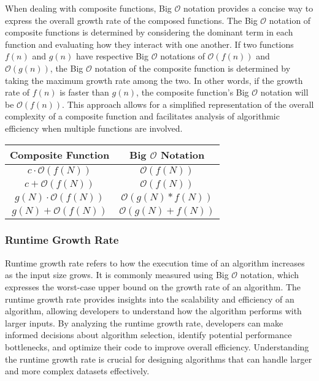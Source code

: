 When dealing with composite functions, Big $\mathcal{O}$ notation provides a concise way to express the overall growth rate of the composed functions. The Big $\mathcal{O}$ notation of composite functions is determined by considering the dominant term in each function and evaluating how they interact with one another. If two functions $f(n)$ and $g(n)$ have respective Big $\mathcal{O}$ notations of $\mathcal{O}(f(n))$ and 
$\mathcal{O}(g(n))$, the Big $\mathcal{O}$ notation of the composite function is determined by taking the maximum growth rate among the two. In other words, if the growth rate of $f(n)$ is faster than $g(n)$, the composite function's Big $\mathcal{O}$ notation will be $\mathcal{O}(f(n))$. This approach allows for a simplified representation of the overall complexity of a composite function and facilitates analysis of algorithmic 
efficiency when multiple functions are involved.

\begin{center}
    \begin{tabular}{|c|c|}
        \hline Composite Function & Big $\mathcal{O}$ Notation \\ \hline
        $c \cdot \mathcal{O}(f(N))$ & $\mathcal{O}(f(N))$ \\ \hline
        $c + \mathcal{O}(f(N))$ & $\mathcal{O}(f(N))$ \\ \hline
        $g(N) \cdot \mathcal{O}(f(N))$ & $\mathcal{O}(g(N)*f(N))$ \\ \hline
        $g(N) + \mathcal{O}(f(N))$ & $\mathcal{O}(g(N) + f(N))$ \\ \hline
    \end{tabular}
\end{center}

\subsubsection{Runtime Growth Rate}

Runtime growth rate refers to how the execution time of an algorithm increases as the input size grows. It is commonly measured using Big $\mathcal{O}$ notation, which expresses the worst-case upper bound on the growth rate of an algorithm. The runtime growth rate provides insights into the scalability and efficiency of an algorithm, allowing developers to understand how the algorithm performs with larger inputs. By analyzing the runtime 
growth rate, developers can make informed decisions about algorithm selection, identify potential performance bottlenecks, and optimize their code to improve overall efficiency. Understanding the runtime growth rate is crucial for designing algorithms that can handle larger and more complex datasets effectively.


